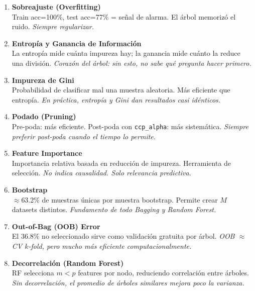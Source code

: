 \documentclass[11pt, a4paper]{book}
\begin{document}
\begin{enumerate}[leftmargin=*, label=\textbf{\arabic*.}]

\item \textbf{Sobreajuste (Overfitting)}\\
  Train acc=100\%, test acc=77\% = señal de alarma. El árbol memorizó el ruido.
  \textit{Siempre regularizar.}

\item \textbf{Entropía y Ganancia de Información}\\
  La entropía mide cuánta impureza hay; la ganancia mide cuánto la reduce una división.
  \textit{Corazón del árbol: sin esto, no sabe qué pregunta hacer primero.}

\item \textbf{Impureza de Gini}\\
  Probabilidad de clasificar mal una muestra aleatoria. Más eficiente que entropía.
  \textit{En práctica, entropía y Gini dan resultados casi idénticos.}

\item \textbf{Podado (Pruning)}\\
  Pre-poda: más eficiente. Post-poda con \texttt{ccp\_alpha}: más sistemática.
  \textit{Siempre preferir post-poda cuando el tiempo lo permite.}

\item \textbf{Feature Importance}\\
  Importancia relativa basada en reducción de impureza. Herramienta de selección.
  \textit{No indica causalidad. Solo relevancia predictiva.}

\item \textbf{Bootstrap}\\
  $\approx$63.2\% de muestras únicas por muestra bootstrap. Permite crear $M$ datasets distintos.
  \textit{Fundamento de todo Bagging y Random Forest.}

\item \textbf{Out-of-Bag (OOB) Error}\\
  El 36.8\% no seleccionado sirve como validación gratuita por árbol.
  \textit{OOB $\approx$ CV $k$-fold, pero mucho más eficiente computacionalmente.}

\item \textbf{Decorrelación (Random Forest)}\\
  RF selecciona $m < p$ features por nodo, reduciendo correlación entre árboles.
  \textit{Sin decorrelación, el promedio de árboles similares mejora poco la varianza.}


\end{enumerate}
\end{document}
